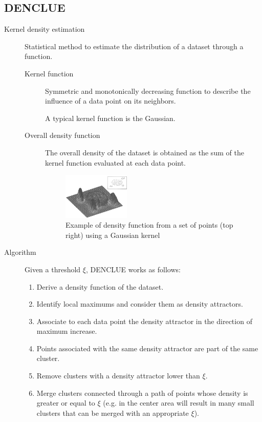 \subsection{DENCLUE}

\begin{description}
    \item[Kernel density estimation] 
        Statistical method to estimate the distribution of a dataset through a function.

        \begin{description}
            \item[Kernel function] 
                Symmetric and monotonically decreasing function to describe the influence of a data point on its neighbors.

                A typical kernel function is the Gaussian.

            \item[Overall density function]
                The overall density of the dataset is obtained as the sum of the kernel function evaluated at each data point.

                \begin{figure}[H]
                    \centering
                    \includegraphics[width=0.35\textwidth]{img/kernel_density_estimation.png}
                    \caption{Example of density function from a set of points (top right) using a Gaussian kernel}
                    \label{img:denclue}
                \end{figure}
        \end{description}

    \item[Algorithm] 
        Given a threshold $\xi$, DENCLUE works as follows:
        \begin{enumerate}
            \item Derive a density function of the dataset.
            \item Identify local maximums and consider them as density attractors.
            \item Associate to each data point the density attractor in the direction of maximum increase.
            \item Points associated with the same density attractor are part of the same cluster.
            \item Remove clusters with a density attractor lower than $\xi$.
            \item Merge clusters connected through a path of points whose density is greater or equal to $\xi$ 
                (e.g. in  the center area will result in many small clusters that can be merged with an appropriate $\xi$).
        \end{enumerate}


\end{description}
